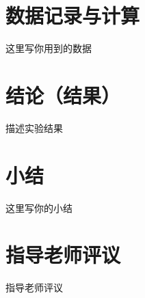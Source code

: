 \documentclass[a4,10pt]{article}
\begin{document}
\section{数据记录与计算}
这里写你用到的数据

\section{结论（结果）}
描述实验结果

\section{小结}
这里写你的小结

\section{指导老师评议}
指导老师评议
\end{document}
